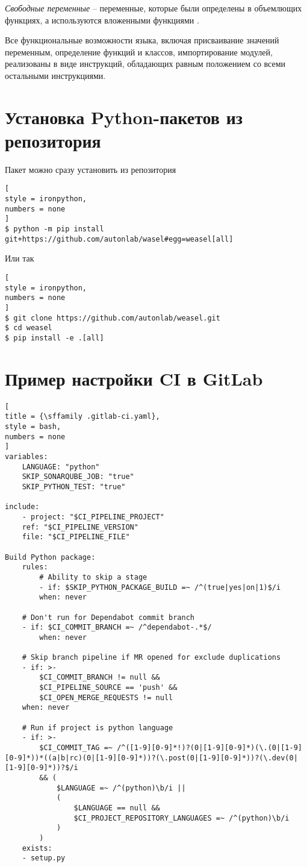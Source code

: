 \documentclass[%
	11pt,
	a4paper,
	utf8,
		]{article}
\begin{document}
\emph{Свободные переменные} -- переменные, которые были определены в объемлющих функциях, а используются вложенными функциями \cite[]{beazley:python-2010}.

Все функциональные возможности языка, включая присваивание значений переменным, определение функций и классов, импортирование модулей, реализованы в виде инструкций, обладающих равным положением со всеми остальными инструкциями.

\section{Установка Python-пакетов из репозитория}

Пакет можно сразу установить из репозитория
\begin{lstlisting}[
style = ironpython,
numbers = none
]
$ python -m pip install git+https://github.com/autonlab/wasel#egg=weasel[all]
\end{lstlisting}

Или так
\begin{lstlisting}[
style = ironpython,
numbers = none
]
$ git clone https://github.com/autonlab/weasel.git
$ cd weasel
$ pip install -e .[all]
\end{lstlisting}

\section{Пример настройки CI в GitLab}

\begin{lstlisting}[
title = {\sffamily .gitlab-ci.yaml},
style = bash,
numbers = none
]
variables:
	LANGUAGE: "python"
	SKIP_SONARQUBE_JOB: "true"
	SKIP_PYTHON_TEST: "true"

include:
	- project: "$CI_PIPELINE_PROJECT"   
	ref: "$CI_PIPELINE_VERSION"       
	file: "$CI_PIPELINE_FILE"         

Build Python package:
	rules:
		# Ability to skip a stage
		- if: $SKIP_PYTHON_PACKAGE_BUILD =~ /^(true|yes|on|1)$/i
		when: never

	# Don't run for Dependabot commit branch
	- if: $CI_COMMIT_BRANCH =~ /^dependabot-.*$/
		when: never

	# Skip branch pipeline if MR opened for exclude duplications
	- if: >-
		$CI_COMMIT_BRANCH != null &&
		$CI_PIPELINE_SOURCE == 'push' &&
		$CI_OPEN_MERGE_REQUESTS != null
	when: never

	# Run if project is python language
	- if: >-
		$CI_COMMIT_TAG =~ /^([1-9][0-9]*!)?(0|[1-9][0-9]*)(\.(0|[1-9][0-9]*))*((a|b|rc)(0|[1-9][0-9]*))?(\.post(0|[1-9][0-9]*))?(\.dev(0|[1-9][0-9]*))?$/i
		&& (
			$LANGUAGE =~ /^(python)\b/i ||
			(
				$LANGUAGE == null &&
				$CI_PROJECT_REPOSITORY_LANGUAGES =~ /^(python)\b/i
			)
		)
	exists:
	- setup.py
\end{lstlisting}
\end{document}
